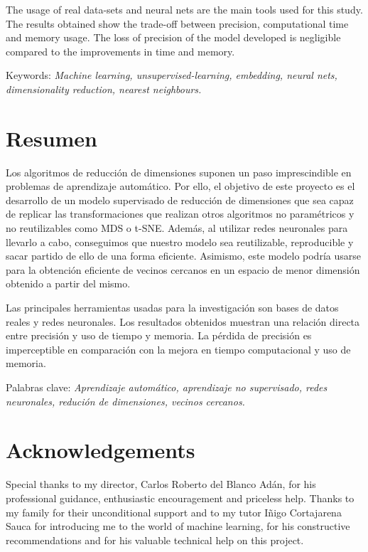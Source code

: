 \documentclass[a4paper,11pt,spanish]{report}
\begin{document}
The usage of real data-sets and neural nets are the main tools used for this study. The results obtained show the trade-off between precision, computational time and memory usage. The loss of precision of the model developed is negligible compared to the improvements in time and memory.

Keywords: \textit{Machine learning, unsupervised-learning, embedding, neural nets, dimensionality reduction, nearest neighbours.}

\chapter*{Resumen}

Los algoritmos de reducción de dimensiones suponen un paso imprescindible en problemas de aprendizaje automático. Por ello, el objetivo de este proyecto es el desarrollo de un modelo supervisado de reducción de dimensiones que sea capaz de replicar las transformaciones que realizan otros algoritmos no paramétricos y no reutilizables como MDS o t-SNE. Además, al utilizar redes neuronales para llevarlo a cabo, conseguimos que nuestro modelo sea reutilizable, reproducible y sacar partido de ello de una forma eficiente. Asimismo, este modelo podría usarse para la obtención eficiente de vecinos cercanos en un espacio de menor dimensión obtenido a partir del mismo.

Las principales herramientas usadas para la investigación son bases de datos reales y redes neuronales. Los resultados obtenidos muestran una relación directa entre precisión y uso de tiempo y memoria. La pérdida de precisión es imperceptible en comparación con la mejora en tiempo computacional y uso de memoria.

Palabras clave: \textit{Aprendizaje automático, aprendizaje no supervisado, redes neuronales, redución de dimensiones, vecinos cercanos.}

\chapter*{Acknowledgements}

Special thanks to my director, Carlos Roberto del Blanco Adán, for his professional guidance, enthusiastic encouragement and priceless help. Thanks to my family for their unconditional support and to my tutor Iñigo Cortajarena Sauca for introducing me to the world of machine learning, for his constructive recommendations and for his valuable technical help on this project.
\end{document}
